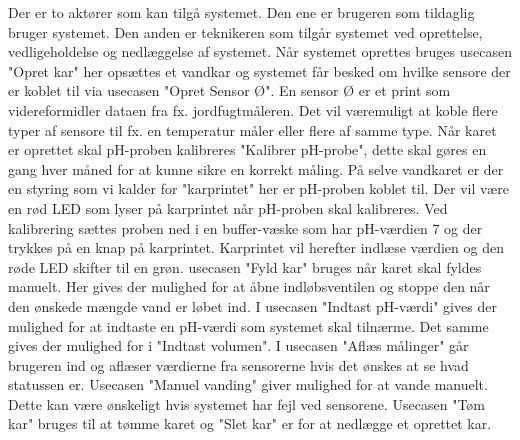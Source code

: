Der er to aktører som kan tilgå systemet. Den ene er brugeren som tildaglig bruger systemet. Den anden er teknikeren som tilgår systemet ved oprettelse, vedligeholdelse og nedlæggelse af systemet. Når systemet oprettes bruges usecasen "Opret kar" her opsættes et vandkar og systemet får besked om hvilke sensore der er koblet til via usecasen "Opret Sensor Ø". En sensor Ø er et print som videreformidler dataen fra fx. jordfugtmåleren. Det vil væremuligt at koble flere typer af sensore til fx. en temperatur måler eller flere af samme type. Når karet er oprettet skal pH-proben kalibreres "Kalibrer pH-probe", dette skal gøres en gang hver måned for at kunne sikre en korrekt måling. På selve vandkaret er der en styring som vi kalder for "karprintet" her er pH-proben koblet til. Der vil være en rød LED som lyser på karprintet når pH-proben skal kalibreres. Ved kalibrering sættes proben ned i en buffer-væske som har pH-værdien 7 og der trykkes på en knap på karprintet. Karprintet vil herefter indlæse værdien og den røde LED skifter til en grøn. usecasen "Fyld kar" bruges når karet skal fyldes manuelt. Her gives der mulighed for at åbne indløbsventilen og stoppe den når den ønskede mængde vand er løbet ind. I usecasen "Indtast pH-værdi" gives der mulighed for at indtaste en pH-værdi som systemet skal tilnærme. Det samme gives der mulighed for i "Indtast volumen". I usecasen "Aflæs målinger" går brugeren ind og aflæser værdierne fra sensorerne hvis det ønskes at se hvad statussen er. Usecasen "Manuel vanding" giver mulighed for at vande manuelt. Dette kan være ønskeligt hvis systemet har fejl ved sensorene. Usecasen "Tøm kar" bruges til at tømme karet og "Slet kar" er for at nedlægge et oprettet kar.  